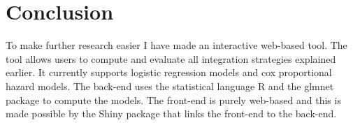\section{Conclusion}
\label{sec:tool-conclusion}
To make further research easier I have made an interactive web-based tool. The tool allows users to compute and evaluate all integration strategies explained earlier. It currently supports logistic regression models and cox proportional hazard models. The back-end uses the statistical language R and the glmnet package to compute the models. The front-end is purely web-based and this is made possible by the Shiny package that links the front-end to the back-end.
